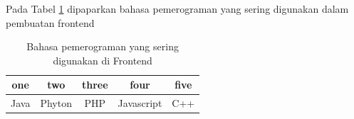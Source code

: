 Pada Tabel \ref{1table} dipaparkan bahasa pemerograman yang sering digunakan dalam pembuatan frontend


\begin{table}[h]
\caption{Bahasa pemerograman yang sering digunakan di Frontend}
\centering
\begin{tabular}{ccccc}
\hline
one&two&three&four&five\\
\hline
Java&Phyton&PHP&Javascript&C++\\
\hline
\end{tabular}
\label{1table}
\end{table}



